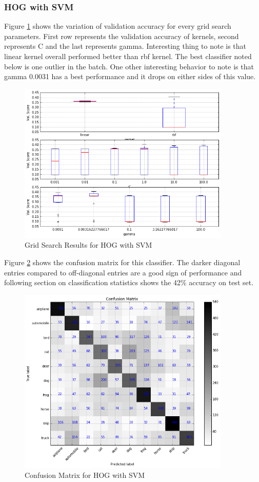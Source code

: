 \documentclass[12pt]{article}
\begin{document}
\subsubsection{HOG with SVM}
Figure \ref{img:svm_cv_hog} shows the variation of validation accuracy for every grid search parameters. First row represents the validation accuracy of kernels, second represents C and the last represents gamma. Interesting thing to note is that linear kernel overall performed better than rbf kernel. The best classifier noted below is one outlier in the batch. One other interesting behavior to note is that gamma 0.0031 has a best performance and it drops on either sides of this value.
\begin{figure}[H]
\centering
\includegraphics[width=0.9\textwidth]{images/svm_cv_hog.png} 
\caption{Grid Search Results for HOG with SVM}
\label{img:svm_cv_hog}
\end{figure}
Figure \ref{img:svm_cm_hog} shows the confusion matrix for this classifier. The darker diagonal entries compared to off-diagonal entries are a good sign of performance and following section on classification statistics shows the 42\% accuracy on test set.
\begin{figure}[H]
\centering
\includegraphics[width=0.9\textwidth]{images/svm_cm_hog.png} 
\caption{Confusion Matrix for HOG with SVM}
\label{img:svm_cm_hog}
\end{figure}
\end{document}
